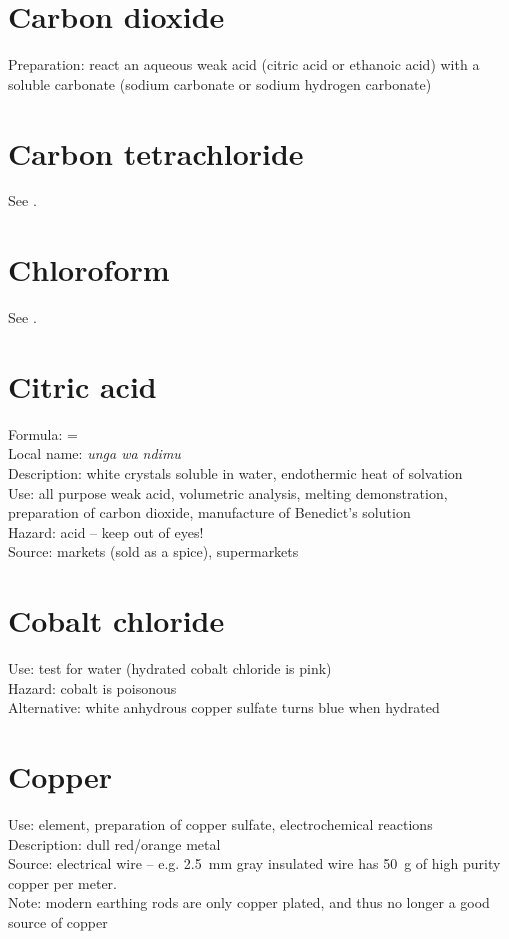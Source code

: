 \section{Carbon dioxide}
\label{sec:}
Preparation: react an aqueous weak acid 
(citric acid or ethanoic acid) with a soluble carbonate 
(sodium carbonate or sodium hydrogen carbonate)

\section{Carbon tetrachloride}
\label{sec:}
See .

\section{Chloroform}
\label{sec:}
See .

\section{Citric acid}
\label{sec:}
Formula:  = \\
Local name: \textit{unga wa ndimu}\\
Description: white crystals soluble in water, 
endothermic heat of solvation\\
Use: all purpose weak acid, 
volumetric analysis, 
melting demonstration, 
preparation of carbon dioxide, 
manufacture of Benedict's solution\\
Hazard: acid – keep out of eyes!\\
Source: markets (sold as a spice), 
supermarkets

\section{Cobalt chloride}
\label{sec:}
Use: test for water (hydrated cobalt chloride is pink)\\
Hazard: cobalt is poisonous\\
Alternative: white anhydrous copper sulfate turns blue when hydrated

\section{Copper}
\label{sec:copper}
Use: element, 
preparation of copper sulfate, 
electrochemical reactions\\
Description: dull red/orange metal\\
Source: electrical wire -- e.g. 
2.5~mm gray insulated wire has 50~g of high purity copper per meter.\\
Note: modern earthing rods are only copper plated, 
and thus no longer a good source of copper

